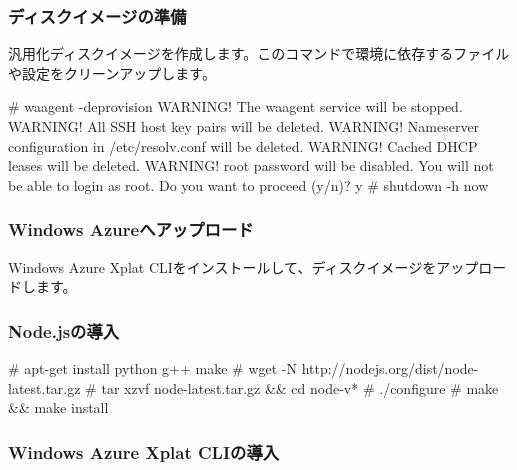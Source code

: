 \documentclass[mingoth,a4paper,twoside]{jsarticle}
\begin{document}
\subsubsection{ディスクイメージの準備}

汎用化ディスクイメージを作成します。このコマンドで環境に依存するファイルや設定をクリーンアップします。

\begin{commandline}
# waagent -deprovision
WARNING! The waagent service will be stopped.
WARNING! All SSH host key pairs will be deleted.
WARNING! Nameserver configuration in /etc/resolv.conf will be deleted.
WARNING! Cached DHCP leases will be deleted.
WARNING! root password will be disabled. You will not be able to login as root.
Do you want to proceed (y/n)? y
# shutdown -h now
\end{commandline}

\subsubsection{Windows Azureへアップロード}

Windows Azure Xplat CLIをインストールして、ディスクイメージをアップロードします。
\subsubsection{Node.jsの導入}

\begin{commandline}
# apt-get install python g++ make
# wget -N http://nodejs.org/dist/node-latest.tar.gz
# tar xzvf node-latest.tar.gz && cd node-v*
# ./configure
# make && make install
\end{commandline}

\subsubsection{Windows Azure Xplat CLIの導入}

\end{document}
